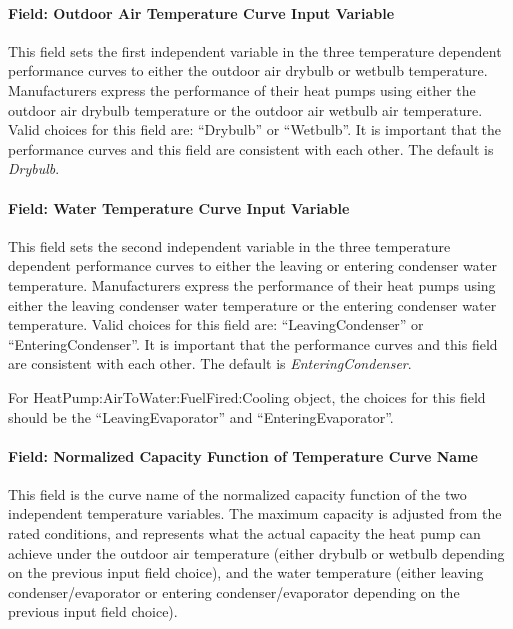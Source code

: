 \paragraph{Field: Outdoor Air Temperature Curve Input Variable}

This field sets the first independent variable in the three temperature dependent performance curves to either the outdoor air drybulb or wetbulb temperature. Manufacturers express the performance of their heat pumps using either the outdoor air drybulb temperature or the outdoor air wetbulb air temperature. Valid choices for this field are: ``Drybulb'' or ``Wetbulb''. It is important that the performance curves and this field are consistent with each other. The default is \emph{Drybulb}.

\paragraph{Field: Water Temperature Curve Input Variable}

This field sets the second independent variable in the three temperature dependent performance curves to either the leaving or entering condenser water temperature. Manufacturers express the performance of their heat pumps using either the leaving condenser water temperature or the entering condenser water temperature. Valid choices for this field are: ``LeavingCondenser'' or ``EnteringCondenser''. It is important that the performance curves and this field are consistent with each other. The default is \emph{EnteringCondenser}.

For HeatPump:AirToWater:FuelFired:Cooling object, the choices for this field should be the ``LeavingEvaporator'' and ``EnteringEvaporator''.

\paragraph{Field: Normalized Capacity Function of Temperature Curve Name}

This field is the curve name of the normalized capacity function of the two independent temperature variables. The maximum capacity is adjusted from the rated conditions, and represents what the actual capacity the heat pump can achieve under the outdoor air temperature (either drybulb or wetbulb depending on the previous input field choice), and the water temperature (either leaving condenser/evaporator or entering condenser/evaporator depending on the previous input field choice).


